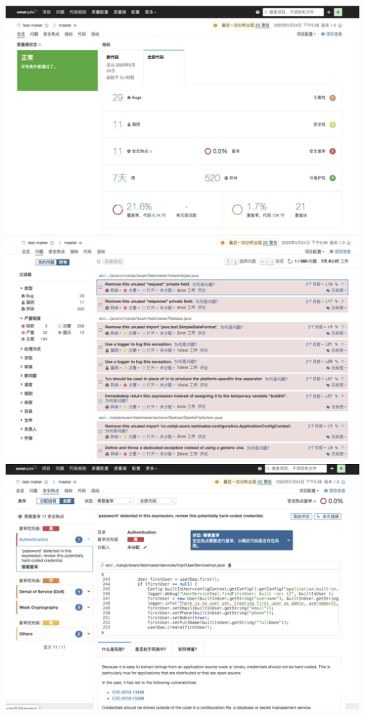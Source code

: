 \documentclass[hyperref, a4paper]{ctexart}
\begin{document}
\includegraphics{screenshots/lab7-pic/back-1.png}
\includegraphics{screenshots/lab7-pic/back-2.png}
\includegraphics{screenshots/lab7-pic/back-3.png}
\end{document}
